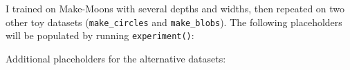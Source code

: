 \documentclass[11pt]{article}
\begin{document}
I trained on Make-Moons with several depths and widths, then repeated on two other toy datasets (\texttt{make\_circles} and \texttt{make\_blobs}). The following placeholders will be populated by running \verb|experiment()|:
\begin{center}
\quad
{}\quad
{}
\end{center}
\noindent Additional placeholders for the alternative datasets:
\begin{center}
\quad
{}
\end{center}
\end{document}
